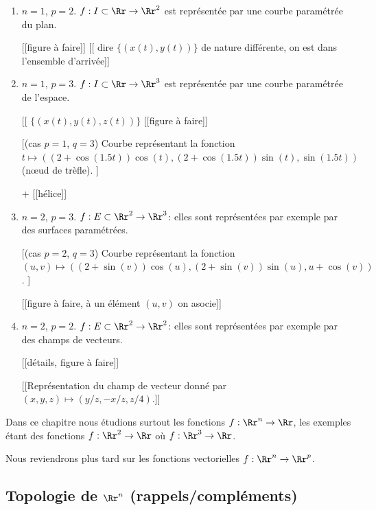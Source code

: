 \documentclass[12pt, class=report,crop=false]{standalone}
\begin{document}
\begin{exemple}
\sauteligne
\begin{enumerate}
 
\item $n=1$, $p=2$. $f: I \subset \Rr \rightarrow \Rr^2$ 
est représentée par une courbe paramétrée du plan.

[[figure à faire]]
[[ dire $\{ (x(t),y(t) ) \}$ de nature différente, on est dans l'ensemble d'arrivée]]

\item $n=1$, $p=3$. $f: I \subset \Rr \rightarrow \Rr^3$ 
est représentée par une courbe paramétrée de l'espace.

[[  $\{ (x(t),y(t),z(t) ) \}$ 
[[figure à faire]]


    [(cas $p=1$, $q=3$) Courbe représentant la fonction $ t \mapsto ((2+\cos(1.5t))\cos(t),  (2+\cos(1.5t))\sin(t),\sin(1.5t))$ (nœud de trèfle). ]

+ [[hélice]]

        
        
\item $n=2$, $p=3$. $f: E \subset \Rr^2 \rightarrow \Rr^3$: elles sont représentées par exemple par des surfaces paramétrées.

    [(cas $p=2$, $q=3$) Courbe représentant la fonction $ (u,v) \mapsto \left( (2+\sin(v))\cos(u), (2+\sin(v))\sin(u),u+\cos(v) \right)$. ]
    
[[figure à faire, à un élément $(u,v)$ on asocie]]

\item $n=2$, $p = 2$. $f: E \subset \Rr^2 \rightarrow \Rr^2$: elles sont représentées par exemple par des champs de vecteurs.

[[détails, figure à faire]]

[[Représentation du champ de vecteur donné par 
  $(x,y,z) \mapsto (y / z,-x /  z,z / 4 )$.]]

\end{enumerate}
\end{exemple}


Dans ce chapitre nous étudions surtout les fonctions $f : \Rr^n \to \Rr$, les exemples étant des fonctions $f : \Rr^2 \to \Rr$ où $f : \Rr^3 \to \Rr$.

Nous reviendrons plus tard sur les fonctions vectorielles $f : \Rr^n \to \Rr^p$.
\subsection{Topologie de $\Rr^n$ (rappels/compléments)}
\end{document}
